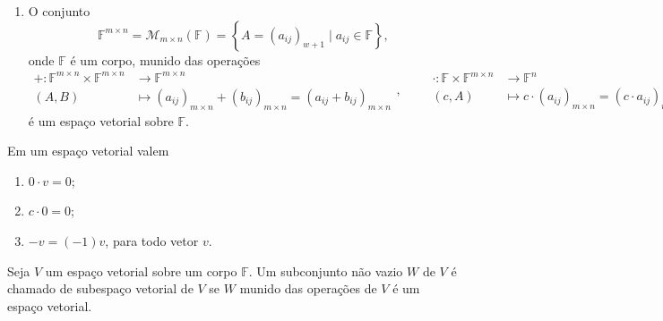 \begin{example}
\begin{enumerate}
		\item
		      O conjunto
		      \[
			      \mathbb{F}^{m\times n}=
			      \mathcal{M}_{m\times n}\left(\mathbb{F}\right)=
			      \left\{
			      A=
			      {\left(a_{ij}\right)}_{w+1}
			      \mid a_{ij}\in
			      \mathbb{F}
			      \right\},
		      \]
		      onde $\mathbb{F}$ é um corpo, munido das operações
		      \[
			      \begin{aligned}
				      +\colon
				      \mathbb{F}^{m\times n}\times
				      \mathbb{F}^{m\times n} &
				      \longrightarrow
				      \mathbb{F}^{m\times n}               \\
				      \left(A,B\right)       & \longmapsto
				      {\left(a_{ij}\right)}_{m\times n}+
				      {\left(b_{ij}\right)}_{m\times n}=
				      {\left(a_{ij}+b_{ij}\right)}_{m\times n}
			      \end{aligned},\qquad
			      \begin{aligned}
				      \cdot\colon
				      \mathbb{F}\times
				      \mathbb{F}^{m\times n} & \longrightarrow
				      \mathbb{F}^{n}                           \\
				      \left(c,A\right)       & \longmapsto
				      c\cdot
				      {\left(a_{ij}\right)}_{m\times n}=
				      {\left(c\cdot a_{ij}\right)}_{m\times n}.
			      \end{aligned}
		      \]
		      é um espaço vetorial sobre $\mathbb{F}$.
	\end{enumerate}
\end{example}

\begin{proposition}
	Em um espaço vetorial valem
	\begin{enumerate}
		\item $0\cdot v=0$;
		\item $c\cdot 0=0$;
		\item $-v=\left(-1\right)v$, para todo vetor $v$.
	\end{enumerate}
\end{proposition}

\begin{definition}
	Seja $V$ um espaço vetorial sobre	um corpo $\mathbb{F}$.
	Um subconjunto não vazio $W$ de $V$ é chamado de subespaço vetorial
	de $V$ se $W$ munido das operações de $V$ é um espaço vetorial.
\end{definition}

